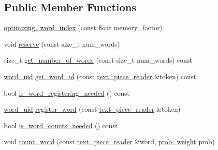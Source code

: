 \subsection*{Public Member Functions}
\begin{DoxyCompactItemize}
\item 
\hyperlink{classuva_1_1smt_1_1bpbd_1_1server_1_1lm_1_1dictionary_1_1optimizing__word__index_a0bf2e2ba600dd82b71cf5d12e6272cae}{optimizing\+\_\+word\+\_\+index} (const float memory\+\_\+factor)
\item 
void \hyperlink{classuva_1_1smt_1_1bpbd_1_1server_1_1lm_1_1dictionary_1_1optimizing__word__index_a38947d043d61a3f9a5acebf79c8e5f02}{reserve} (const size\+\_\+t num\+\_\+words)
\item 
size\+\_\+t \hyperlink{classuva_1_1smt_1_1bpbd_1_1server_1_1lm_1_1dictionary_1_1optimizing__word__index_a683624c90e23d3d821ffa637a87a1d4c}{get\+\_\+number\+\_\+of\+\_\+words} (const size\+\_\+t num\+\_\+words) const 
\item 
\hyperlink{namespaceuva_1_1smt_1_1bpbd_1_1server_a6bfe45ba344d65a7fdd7d26156328ddc}{word\+\_\+uid} \hyperlink{classuva_1_1smt_1_1bpbd_1_1server_1_1lm_1_1dictionary_1_1optimizing__word__index_aafcc7f59a70769898cca5e283f340be1}{get\+\_\+word\+\_\+id} (const \hyperlink{classuva_1_1utils_1_1file_1_1text__piece__reader}{text\+\_\+piece\+\_\+reader} \&token) const 
\item 
bool \hyperlink{classuva_1_1smt_1_1bpbd_1_1server_1_1lm_1_1dictionary_1_1optimizing__word__index_a0da36615a46a9f9112d376961c379e1c}{is\+\_\+word\+\_\+registering\+\_\+needed} () const 
\item 
\hyperlink{namespaceuva_1_1smt_1_1bpbd_1_1server_a6bfe45ba344d65a7fdd7d26156328ddc}{word\+\_\+uid} \hyperlink{classuva_1_1smt_1_1bpbd_1_1server_1_1lm_1_1dictionary_1_1optimizing__word__index_a03a89d044fb067a0d6a1eabbd81aaddb}{register\+\_\+word} (const \hyperlink{classuva_1_1utils_1_1file_1_1text__piece__reader}{text\+\_\+piece\+\_\+reader} \&token)
\item 
bool \hyperlink{classuva_1_1smt_1_1bpbd_1_1server_1_1lm_1_1dictionary_1_1optimizing__word__index_ae4996023eca522ac632145dd58b411ed}{is\+\_\+word\+\_\+counts\+\_\+needed} () const 
\item 
void \hyperlink{classuva_1_1smt_1_1bpbd_1_1server_1_1lm_1_1dictionary_1_1optimizing__word__index_a7136ef021c82a24a98b8f334745701dc}{count\+\_\+word} (const \hyperlink{classuva_1_1utils_1_1file_1_1text__piece__reader}{text\+\_\+piece\+\_\+reader} \&word, \hyperlink{namespaceuva_1_1smt_1_1bpbd_1_1server_a01e9ea4de9c226f4464862e84ff0bbcc}{prob\+\_\+weight} prob)

\end{DoxyCompactItemize}
